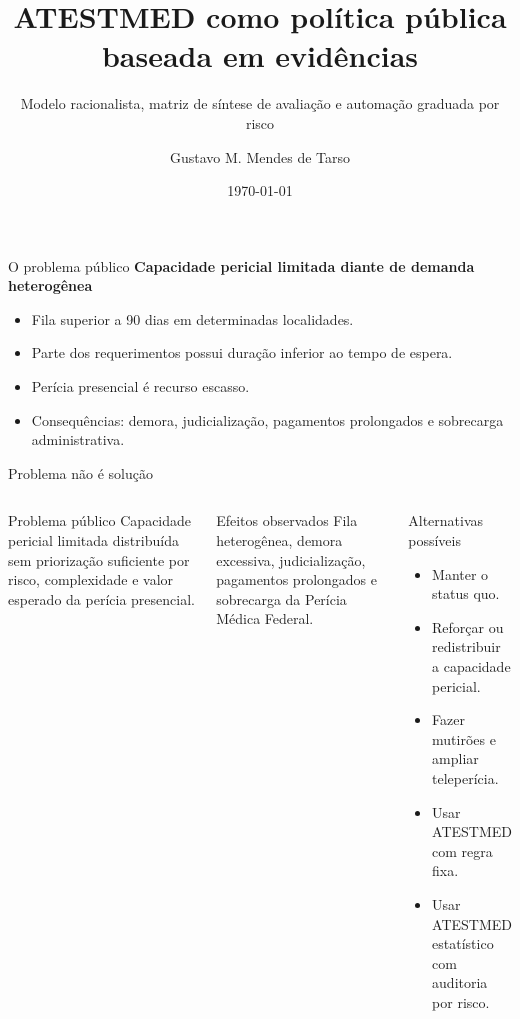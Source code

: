 \documentclass[presentation,aspectratio=169]{beamer}
\author{Gustavo M. Mendes de Tarso}
\date{\today}
\title{ATESTMED como política pública baseada em evidências}
\subtitle{Modelo racionalista, matriz de síntese de avaliação e automação graduada por risco}
\begin{document}
\maketitle
\begin{frame}[t]{O problema público}
\vspace{0.15cm}
{\large\textbf{Capacidade pericial limitada diante de demanda heterogênea}}\par\vspace{0.42cm}
\begin{itemize}\setlength\itemsep{0.45em}
\item Fila superior a 90 dias em determinadas localidades.
\item Parte dos requerimentos possui duração inferior ao tempo de espera.
\item Perícia presencial é recurso escasso.
\item Consequências: demora, judicialização, pagamentos prolongados e sobrecarga administrativa.
\end{itemize}
\vfill
{}
\end{frame}

\begin{frame}[t]{Problema não é solução}
\begin{columns}[T,onlytextwidth]
\begin{block}{Problema público}\small
Capacidade pericial limitada distribuída sem priorização suficiente por risco, complexidade e valor esperado da perícia presencial.
\end{block}
\vspace{0.12cm}
\begin{block}{Efeitos observados}\small
Fila heterogênea, demora excessiva, judicialização, pagamentos prolongados e sobrecarga da Perícia Médica Federal.
\end{block}
\begin{block}{Alternativas possíveis}\small
\begin{itemize}\setlength\itemsep{0.28em}
\item Manter o status quo.
\item Reforçar ou redistribuir a capacidade pericial.
\item Fazer mutirões e ampliar teleperícia.
\item Usar ATESTMED com regra fixa.
\item Usar ATESTMED estatístico com auditoria por risco.
\end{itemize}
\end{block}
\end{columns}
\end{frame}
\end{document}
